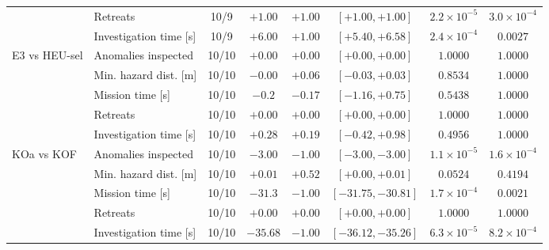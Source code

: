 \begin{table}[t]
\begin{tabular}{llcccccc}
              & Retreats                  & 10/9 & $+1.00$ & $+1.00$ & $[+1.00,+1.00]$ & $2.2{\times}10^{-5}$ & $3.0{\times}10^{-4}$\\
              & Investigation time [s]    & 10/9 & $+6.00$ & $+1.00$ & $[+5.40,+6.58]$ & $2.4{\times}10^{-4}$ & $0.0027$\\
E3 vs HEU-sel & Anomalies inspected       & 10/10 & $+0.00$ & $+0.00$ & $[+0.00,+0.00]$ & $1.0000$ & $1.0000$\\
              & Min. hazard dist. [m]     & 10/10 & $-0.00$ & $+0.06$ & $[-0.03,+0.03]$ & $0.8534$ & $1.0000$\\
              & Mission time [s]          & 10/10 & $-0.2$ & $-0.17$ & $[-1.16,+0.75]$ & $0.5438$ & $1.0000$\\
              & Retreats                  & 10/10 & $+0.00$ & $+0.00$ & $[+0.00,+0.00]$ & $1.0000$ & $1.0000$\\
              & Investigation time [s]    & 10/10 & $+0.28$ & $+0.19$ & $[-0.42,+0.98]$ & $0.4956$ & $1.0000$\\
KOa vs KOF    & Anomalies inspected       & 10/10 & $-3.00$ & $-1.00$ & $[-3.00,-3.00]$ & $1.1{\times}10^{-5}$ & $1.6{\times}10^{-4}$\\
              & Min. hazard dist. [m]     & 10/10 & $+0.01$ & $+0.52$ & $[+0.00,+0.01]$ & $0.0524$ & $0.4194$\\
              & Mission time [s]          & 10/10 & $-31.3$ & $-1.00$ & $[-31.75,-30.81]$ & $1.7{\times}10^{-4}$ & $0.0021$\\
              & Retreats                  & 10/10 & $+0.00$ & $+0.00$ & $[+0.00,+0.00]$ & $1.0000$ & $1.0000$\\
              & Investigation time [s]    & 10/10 & $-35.68$ & $-1.00$ & $[-36.12,-35.26]$ & $6.3{\times}10^{-5}$ & $8.2{\times}10^{-4}$\\
\hline
\end{tabular}
\end{table}

